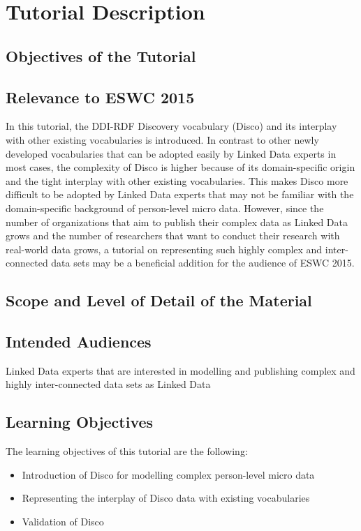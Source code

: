 \documentclass{llncs}
\begin{document}
\section{Tutorial Description}

\subsection{Objectives of the Tutorial} 

\subsection{Relevance to ESWC 2015}
In this tutorial, the DDI-RDF Discovery vocabulary (Disco) and its interplay with other existing vocabularies is introduced. In contrast to other newly developed vocabularies that can be adopted easily by Linked Data experts in most cases, the complexity of Disco is higher because of its domain-specific origin and the tight interplay with other existing vocabularies. This makes Disco more difficult to be adopted by Linked Data experts that may not be familiar with the domain-specific background of person-level micro data. However, since the number of organizations that aim to publish their complex data as Linked Data grows and the number of researchers that want to conduct their research with real-world data grows, a tutorial on representing such highly complex and inter-connected data sets may be a beneficial addition for the audience of ESWC 2015.

\subsection{Scope and Level of Detail of the Material}

\subsection{Intended Audiences}
Linked Data experts that are interested in modelling and publishing complex and highly inter-connected data sets as Linked Data

\subsection{Learning Objectives}
The learning objectives of this tutorial are the following:
\begin{itemize} 
\item Introduction of Disco for modelling complex person-level micro data
\item Representing the interplay of Disco data with existing vocabularies
\item Validation of Disco
\end{itemize}
\end{document}
